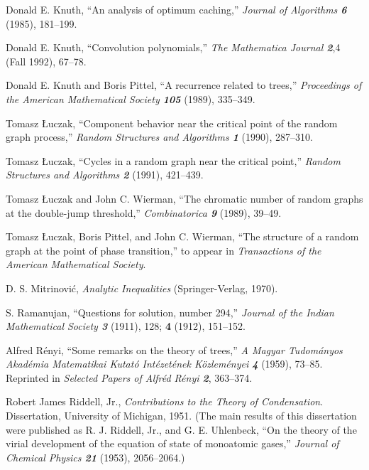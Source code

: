 \smallskip
\bib [\AOC]\enspace
Donald E. Knuth, ``An analysis of optimum caching,'' 
{\sl Journal of Algorithms\/ \bf 6} (1985), 181--199.

\smallskip
\bib [\CP]\enspace
Donald E. Knuth, ``Convolution polynomials,'' {\sl The Mathematica
Journal\/ \bf2},4 (Fall  1992), 67--78.

\smallskip
\bib [\KP]\enspace
Donald E. Knuth and Boris Pittel, ``A recurrence related to trees,''
{\sl Proceedings of the American Mathematical Society\/ \bf 105}
(1989), 335--349.

\smallskip
\bib [\Li]\enspace
Tomasz \L uczak, ``Component behavior near the critical point of the random
graph process,'' {\sl Random Structures and Algorithms\/ \bf1} (1990),
287--310.

\smallskip
\bib [\Lii]\enspace
Tomasz \L uczak, ``Cycles in a random graph near the critical point,''
{\sl Random Structures and Algorithms\/ \bf 2} (1991), 421--439.

\smallskip
\bib [\LW]\enspace
Tomasz \L uczak and John C. Wierman, ``The chromatic number of random
graphs at the double-jump threshold,'' {\sl Combinatorica\/ \bf 9}
(1989), 39--49.

\smallskip
\bib [\LPW]\enspace
Tomasz \L uczak, Boris Pittel, and John C. Wierman, ``The
structure of a random graph at the point of phase transition,''
to appear in {\sl Transactions of the American Mathematical Society}.

\smallskip
\bib [\Mit]\enspace
D. S. Mitrinovi\'c, {\sl Analytic Inequalities\/} (Springer-Verlag, 1970).

\smallskip
\bib [\Ram]\enspace
S. Ramanujan, ``Questions for solution, number 294,'' {\sl Journal of
the Indian Mathematical Society\/ \bf3} (1911), 128; {\bf4} (1912), 151--152.

\smallskip
\bib [\Ren]\enspace
Alfred R\'enyi, ``Some remarks on the theory of trees,''
{\sl A Magyar Tudom\'anyos Aka\-d\'emia Matematikai Kutat\'o
Int\'ezet\'enek K\"ozlem\'enyei\/  \bf 4} (1959), 73--85. Reprinted in
{\sl Selected Papers of Alfr\'ed R\'enyi\/ \bf 2}, 363--374.

\smallskip
\bib [\Rid]\enspace
Robert James Riddell, Jr., {\sl Contributions to the Theory of Condensation}.
Dissertation,
 University of Michigan, 1951. (The main results of this dissertation
were published as R. J. Riddell, Jr., and G. E. Uhlenbeck, ``On the theory of
the virial development of the equation of state of monoatomic gases,''
{\sl Journal of Chemical Physics\/ \bf 21} (1953), 2056--2064.)

